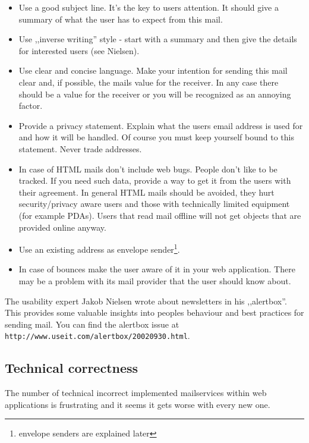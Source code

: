 \documentclass{article}
\begin{document}
\begin{itemize}
  \item Use a good subject line. It's the key to users attention. It
        should give a summary of what the user has to expect from this mail.
  \item Use ,,inverse writing'' style - start with a summary and then
        give the details for interested users (see Nielsen).
  \item Use clear and concise language. Make your intention for sending
        this mail clear and, if possible, the mails value for the receiver.
	In any case there should be a value for the receiver or you will
	be recognized as an annoying factor.
  \item Provide a privacy statement. Explain what the users email address
        is used for and how it will be handled. Of course you must keep
	yourself bound to this statement. Never trade addresses.
  \item In case of HTML mails don't include web bugs. People don't like
        to be tracked. If you need such data, provide a way to get it from
	the users with their agreement. In general HTML mails should be
	avoided, they hurt security/privacy aware users and those with
	technically limited equipment (for example PDAs). Users that read
	mail offline will not get objects that are provided online
	anyway.
  \item Use an existing address as envelope sender\footnote{envelope senders
        are explained later}.
  \item In case of bounces make the user aware of it in your web
        application. There may be a problem with its mail provider that
	the user should know about.
\end{itemize}

The usability expert Jakob Nielsen wrote about newsletters in his
,,alertbox''. This provides some valuable
insights into peoples behaviour and best practices for sending mail.
You can find the alertbox issue at\\
\texttt{http://www.useit.com/alertbox/20020930.html}.

\subsection{Technical correctness}

The number of technical incorrect implemented mailservices within web
applications is frustrating and it seems it gets worse with every new one.
\end{document}
